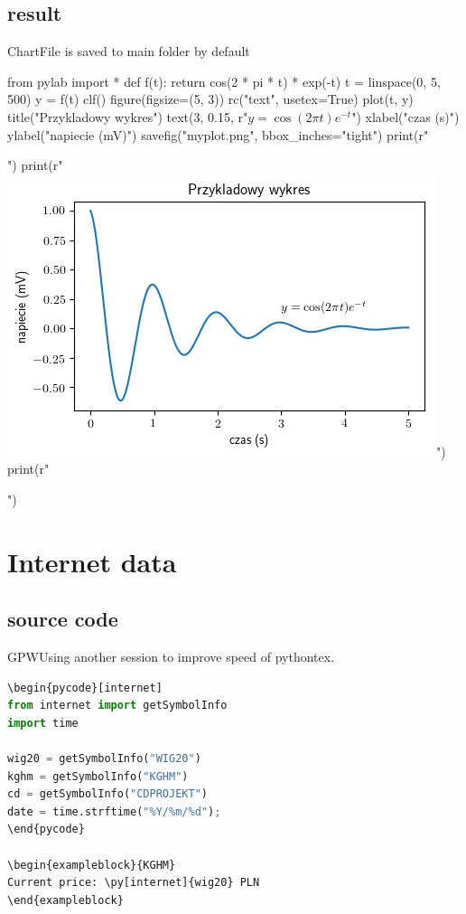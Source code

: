 \documentclass[
aspectratio=1610,
hyperref={pdfpagemode=FullScreen},
english,
usenames,
dvipsnames
]
{beamer} %
\begin{document}
\subsection{result}
\begin{frame}[fragile]{Chart}{File is saved to main folder by default}
\begin{pycode}[chart]
from pylab import *
def f(t):
    return cos(2 * pi * t) * exp(-t)
t = linspace(0, 5, 500)
y = f(t)
clf()
figure(figsize=(5, 3))
rc("text", usetex=True)
plot(t, y)
title("Przykladowy wykres")
text(3, 0.15, r"$y = \cos(2 \pi t) e^{-t}$")
xlabel("czas (s)")
ylabel("napiecie (mV)")
savefig("myplot.png", bbox_inches="tight")
print(r"\begin{center}")
print(r"\includegraphics[scale=1.0, keepaspectratio]{myplot.png}")
print(r"\end{center}")
\end{pycode}
\end{frame}


\section{Internet data}
\subsection{source code}
\begin{frame}[fragile]{GPW}{Using another session to improve speed of pythontex.}
\begin{lstlisting}[language=python]
\begin{pycode}[internet]
from internet import getSymbolInfo
import time

wig20 = getSymbolInfo("WIG20")
kghm = getSymbolInfo("KGHM")
cd = getSymbolInfo("CDPROJEKT")
date = time.strftime("%Y/%m/%d");
\end{pycode}

\begin{exampleblock}{KGHM}
Current price: \py[internet]{wig20} PLN
\end{exampleblock}

\end{lstlisting}
\end{frame}
\end{document}
